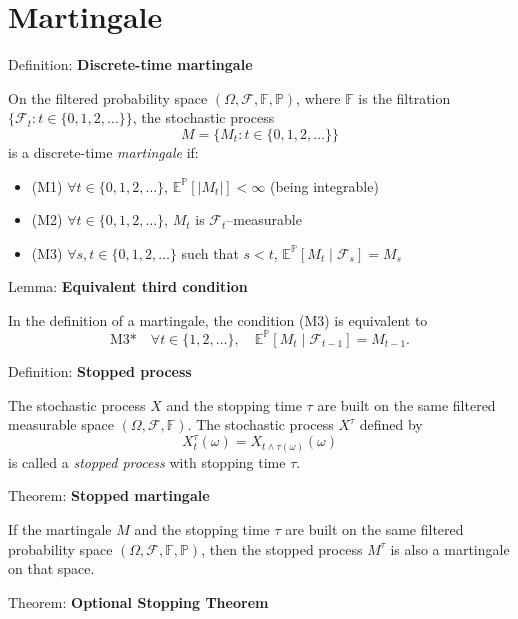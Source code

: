 \documentclass[12pt,a4paper]{article}
\begin{document}
\section{Martingale}

Definition: \textbf{Discrete-time martingale}

On the filtered probability space $(\Omega, \mathcal{F}, \mathbb{F}, \mathbb{P})$, where $\mathbb{F}$ is the filtration $\{\mathcal{F}_t : t \in \{0, 1, 2, \ldots\}\}$, the stochastic process
$$M = \{M_t : t \in \{0, 1, 2, \ldots\}\}$$
is a discrete-time \textit{martingale} if:

\begin{itemize}
	\item (M1) $\forall t \in \{0, 1, 2, \ldots\}$, $\mathbb{E}^{\mathbb{P}}[|M_t|] < \infty$ \quad (being integrable)
	\item (M2) $\forall t \in \{0, 1, 2, \ldots\}$, $M_t$ is $\mathcal{F}_t$--measurable
	\item (M3) $\forall s, t \in \{0, 1, 2, \ldots\}$ such that $s < t$, $\mathbb{E}^{\mathbb{P}}[M_t \mid \mathcal{F}_s] = M_s$
\end{itemize}
\vspace{0.5em}

Lemma: \textbf{Equivalent third condition}

In the definition of a martingale, the condition (M3) is equivalent to
$$\text{M3*} \quad \forall t \in \{1, 2, \ldots\}, \quad \mathbb{E}^{\mathbb{P}}[M_t \mid \mathcal{F}_{t-1}] = M_{t-1}.$$
\vspace{0.5em}

Definition: \textbf{Stopped process}

The stochastic process $X$ and the stopping time $\tau$ are built on the same filtered measurable space $(\Omega, \mathcal{F}, \mathbb{F})$. The stochastic process $X^{\tau}$ defined by
$$X_t^{\tau}(\omega) = X_{t \wedge \tau(\omega)}(\omega)$$
is called a \textit{stopped process} with stopping time $\tau$.
\vspace{0.5em}

Theorem: \textbf{Stopped martingale}

If the martingale $M$ and the stopping time $\tau$ are built on the same filtered probability space $(\Omega, \mathcal{F}, \mathbb{F}, \mathbb{P})$, then the stopped process $M^{\tau}$ is also a martingale on that space.
\vspace{0.5em}

Theorem: \textbf{Optional Stopping Theorem}
\vspace{0.5em}
\end{document}
